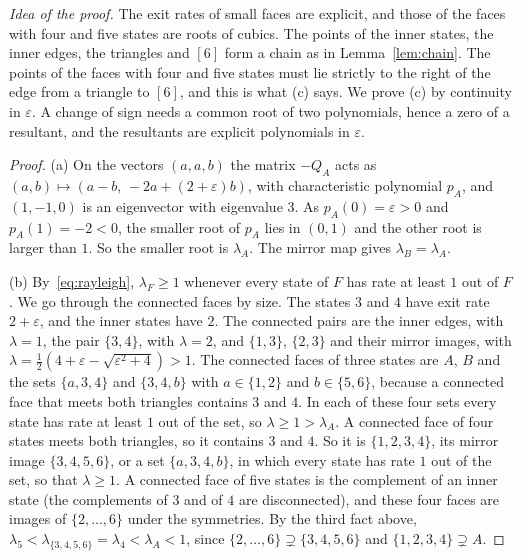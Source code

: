 \emph{Idea of the proof.} The exit rates of small faces are explicit, and
those of the faces with four and five states are roots of cubics. The points
of the inner states, the inner edges, the triangles and $[6]$ form a chain as
in Lemma~\ref{lem:chain}. The points of the faces with four and five states
must lie strictly to the right of the edge from a triangle to $[6]$, and this
is what (c) says. We prove (c) by continuity in
$\varepsilon$. A change of sign needs a common root of two polynomials, hence a
zero of a resultant, and the resultants are explicit polynomials in
$\varepsilon$.

\begin{proof}
(a) On the vectors $(a,a,b)$ the matrix $-Q_A$ acts as
$(a,b)\mapsto(a-b,\,-2a+(2+\varepsilon)b)$, with characteristic polynomial
$p_A$, and $(1,-1,0)$ is an eigenvector with eigenvalue $3$. As
$p_A(0)=\varepsilon>0$ and $p_A(1)=-2<0$, the smaller root of $p_A$ lies in
$(0,1)$ and the other root is larger than $1$. So the smaller root is
$\lambda_A$. The mirror map gives $\lambda_B=\lambda_A$.

(b) By~\eqref{eq:rayleigh}, $\lambda_F\ge1$ whenever every state of $F$ has
rate at least $1$ out of $F$. We go through the connected faces by size. The
states $3$ and $4$ have exit rate $2+\varepsilon$, and the inner states have
$2$. The connected pairs are the inner edges, with $\lambda=1$, the pair
$\{3,4\}$, with $\lambda=2$, and $\{1,3\}$, $\{2,3\}$ and their mirror images,
with $\lambda=\frac12(4+\varepsilon-\sqrt{\varepsilon^2+4})>1$. The connected
faces of three states are $A$, $B$ and the sets $\{a,3,4\}$ and $\{3,4,b\}$
with $a\in\{1,2\}$ and $b\in\{5,6\}$, because a connected face that meets both
triangles contains $3$ and $4$. In each of these four sets every state has
rate at least $1$ out of the set, so $\lambda\ge1>\lambda_A$. A connected face
of four states meets both triangles, so it contains $3$ and $4$. So it is
$\{1,2,3,4\}$, its mirror image $\{3,4,5,6\}$, or a set $\{a,3,4,b\}$, in which every state has rate $1$ out
of the set, so that $\lambda\ge1$. A connected face of five states is the
complement of an inner state (the complements of $3$ and of $4$ are
disconnected), and these four faces are images of $\{2,\dots,6\}$
under the symmetries. By the third fact above,
$\lambda_5<\lambda_{\{3,4,5,6\}}=\lambda_4<\lambda_A<1$, since
$\{2,\dots,6\}\supsetneq\{3,4,5,6\}$ and $\{1,2,3,4\}\supsetneq A$.


\end{proof}
